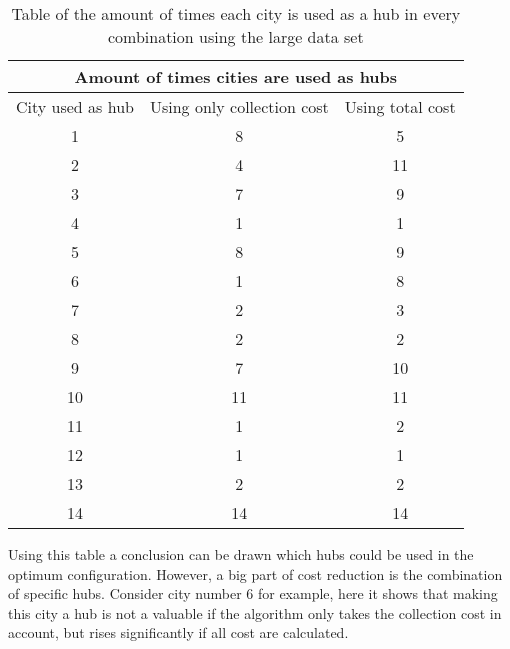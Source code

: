 \documentclass{article}
\begin{document}
            \begin{table}[h!]
                \begin{center}
                \begin{tabular}{||c|c|c||}
                    \hline
                    \multicolumn{3}{||c||}{Amount of times cities are used as hubs} \\
                    \hline
                    \hline
                    City used as hub & Using only collection cost & Using total cost\\
                    \hline
                    \hline
                    1 &  8 & 5 \\
                    \hline
                    2 & 4   & 11 \\
                    \hline
                    3& 7 & 9\\
                    \hline
                    4  & 1 & 1 \\
                    \hline
                    5 & 8 & 9\\
                    \hline
                    6 & 1 & 8   \\
                    \hline
                    7 & 2& 3 \\
                    \hline
                    8 & 2 & 2 \\
                    \hline
                    9 &  7& 10 \\
                    \hline
                    10 & 11 & 11 \\
                    \hline
                    11 & 1& 2 \\
                    \hline
                    12 & 1 & 1 \\
                    \hline
                    13 & 2& 2 \\
                    \hline
                    14 & 14& 14 \\
                    \hline
                \end{tabular}
                \end{center}
                \caption{Table of the amount of times each city is used as a hub in every combination using the large data set}
                \label{amount of times hubs are used in collection} 
            \end{table}
    
            Using this table a conclusion can be drawn which hubs could be used in the optimum configuration. However, a big part of cost reduction is the combination of specific hubs. Consider city number 6 for example, here it shows that making this city a hub is not a valuable if the algorithm only takes the collection cost in account, but rises significantly if all cost are calculated. 
            
\end{document}
